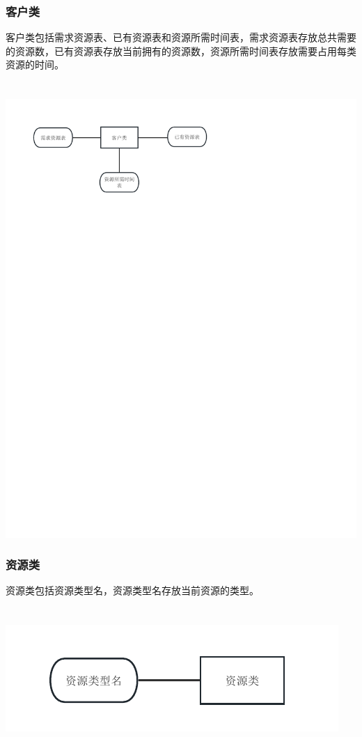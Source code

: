 \documentclass{article}
\begin{document}
			\subsubsection{客户类}
			客户类包括需求资源表、已有资源表和资源所需时间表，需求资源表存放总共需要的资源数，已有资源表存放当前拥有的资源数，资源所需时间表存放需要占用每类资源的时间。
				~\\
				~\\
				~\\
				{\centering
					\includegraphics[align=c,width=\textwidth]{数据结构_客户类.pdf}
				}
			\subsubsection{资源类}
			资源类包括资源类型名，资源类型名存放当前资源的类型。
				~\\
				~\\
				~\\
				{\centering
					\includegraphics[width=\columnwidth,align=c]{数据结构_资源类.pdf}
				}
\end{document}
